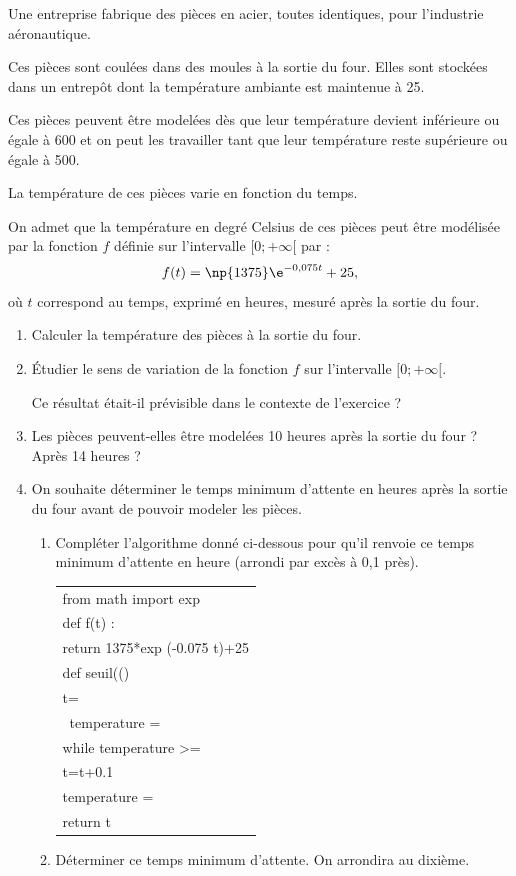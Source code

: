 \medskip

Une entreprise fabrique des pièces en acier, toutes identiques, pour l’industrie
aéronautique.

Ces pièces sont coulées dans des moules à la sortie du four. Elles sont stockées dans un
entrepôt dont la température ambiante est maintenue à 25\textcelsius.

Ces pièces peuvent être modelées dès que leur température devient inférieure ou égale à
600\textcelsius{} et on peut les travailler tant que leur température reste supérieure ou égale à 500\textcelsius.

La température de ces pièces varie en fonction du temps.

On admet que la température en degré Celsius de ces pièces peut être modélisée par la
fonction $f$ définie sur l’intervalle $[0 ; +\infty[$ par :
\[f(t) = \np{1 375}\e^{-0,075t} + 25,\]
où $t$ correspond au temps, exprimé en heures, mesuré après la sortie du four.

\begin{enumerate}
\item  Calculer la température des pièces à la sortie du four.
\item Étudier le sens de variation de la fonction $f$ sur l’intervalle $[0 ; +\infty[$.

 Ce résultat était-il prévisible dans le contexte de l’exercice ?
\item Les pièces peuvent-elles être modelées 10 heures après la sortie du four ? Après 14 heures ?
\item On souhaite déterminer le temps minimum d’attente en heures après la sortie du four avant
de pouvoir modeler les pièces.

\begin{enumerate}
\item  Compléter l’algorithme donné ci-dessous pour qu’il renvoie ce temps minimum d’attente en heure (arrondi par excès à 0,1 près).

\begin{tabular}[]{l}
from math import exp\\
def f(t) :\\
\phantom{xxxx}return 1375*exp (-0.075 t)+25\\
def seuil(()\\
\phantom{xxxx}t=\dotfill\\\
\phantom{xxxx}temperature =\dotfill\\
\phantom{xxxx}while temperature >=\dotfill\\
\phantom{xxxxxx}t=t+0.1\\
\phantom{xxxxxx}temperature =\dotfill\\
\phantom{xxxx}return t\\
\end{tabular}

\item Déterminer ce temps minimum d’attente. On arrondira au dixième.
\end{enumerate}
\end{enumerate}

\vspace{0,5cm}

